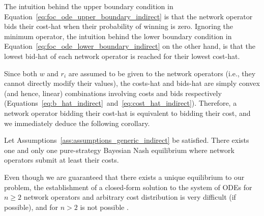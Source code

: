 The intuition behind the upper boundary condition in Equation~\eqref{eq:foc_ode_upper_boundary_indirect} is that the network operator bids their cost-hat when their probability of winning is zero. Ignoring the minimum operator, the intuition behind the lower boundary condition in Equation~\eqref{eq:foc_ode_lower_boundary_indirect} on the other hand, is that the lowest bid-hat of each network operator is reached for their lowest cost-hat.

Since both $w$ and $r_i$ are assumed to be given to the network operators (i.e., they cannot directly modify their values), the costs-hat and bids-hat are simply convex (and hence, linear) combinations involving costs and bids respectively (Equations~\eqref{eq:b_hat_indirect}~and~\eqref{eq:cost_hat_indirect}). Therefore, a network operator bidding their cost-hat is equivalent to bidding their cost, and we immediately deduce the following corollary.
\begin{corollary}
\label{cor:characterization_of_the_equilibrium}
Let Assumptions~\ref{ass:assumptions_generic_indirect} be satisfied. There exists one and only one pure-strategy Bayesian Nash equilibrium where network operators submit at least their costs.
\end{corollary}

Even though we are guaranteed that there exists a unique equilibrium to our problem, the establishment of a closed-form solution to the system of ODEs for $n\ge 2$ network operators and arbitrary cost distribution is very difficult (if possible), and for $n>2$ is not possible \cite{Lebrun2006, Krishna10}.

